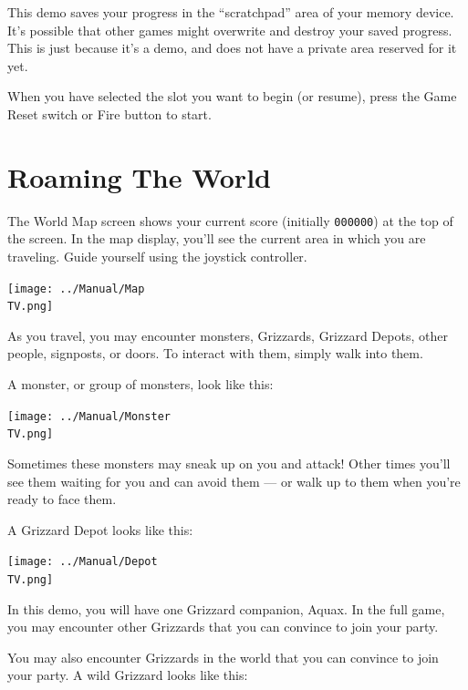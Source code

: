 \documentclass[10pt,twocolumn,openany,article]{memoir}
\newcommand\TV{NTSC}
\newcommand\TV{PAL}
\newcommand\TV{SECAM}
\begin{document}
\ifdefined\DEMO
\skip
This  demo  saves your  progress  in  the  ``scratchpad'' area  of  your
memory  device.  It's possible  that  other  games might  overwrite  and
destroy your saved progress. This is  just because it's a demo, and does
not have a private area reserved for it yet.
\skip
\fi

When you have selected the slot you want to begin (or resume), press the
Game Reset switch or Fire button to start.

\section{Roaming The World}

The   World   Map   screen   shows   your   current   score   (initially
\texttt{000000}) at  the top of the  screen. In the map  display, you'll
see the  current area in which  you are traveling. Guide  yourself using
the joystick controller.

\begin{center}
  \texttt{[image: ../Manual/Map\\TV.png]}
\end{center}

As   you  travel,   you   may  encounter   monsters,\ifdefined\DEMO\else
Grizzards,  \fi  Grizzard Depots,  other  people,  signposts, or  doors.
To interact with them, simply walk into them.

A  monster,  or group  of  monsters,  look  like this:

\begin{center}
  \texttt{[image: ../Manual/Monster\\TV.png]}
\end{center}

Sometimes these  monsters may sneak  up on  you and attack!  Other times
you'll see  them waiting for you  and can avoid  them --- or walk  up to
them when you're ready to face them.

A Grizzard Depot looks like this:

\begin{center}
  \texttt{[image: ../Manual/Depot\\TV.png]}
\end{center}

\ifdefined\DEMO
In this demo,  you will have one Grizzard companion,  Aquax. In the full
game, you  may encounter other Grizzards  that you can convince  to join
your party.

\else

You may also  encounter Grizzards in the world that  you can convince to
join your party. A wild Grizzard looks like this:
\end{document}
